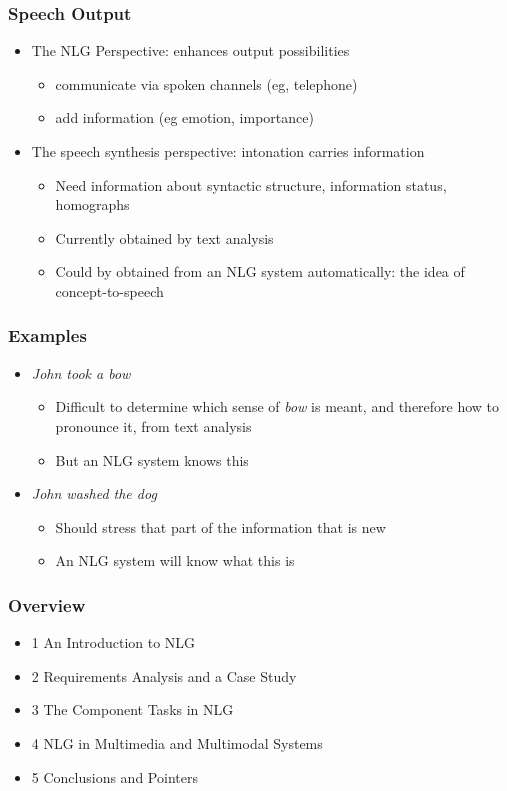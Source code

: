 \documentclass[compress,color=usenames]{beamer}
\begin{document}
\begin{frame}
\frametitle{
Speech Output}

\label{f93}
\begin{itemize}
\item {{The NLG Perspective: enhances output possibilities}}
\begin{itemize}
\item communicate via spoken channels (eg, telephone)
\item add information (eg emotion, importance)
\end{itemize}
\item {{The speech synthesis perspective: intonation carries information}}
\begin{itemize}
\item Need information about syntactic structure, information status, homographs
\item Currently obtained by text analysis
\item Could by obtained from an NLG system automatically:  the idea of concept-to-speech
\end{itemize}
\end{itemize}
 
\end{frame}

\begin{frame}
\frametitle{
Examples}

\label{f95}
\begin{itemize}
\item {{\textit{John took a bow}}}
\begin{itemize}
\item Difficult to determine which sense of \textit{bow} is meant, and therefore how to pronounce it, from text analysis
\item But an NLG system knows this
\end{itemize}
\item {{\textit{John washed the dog}}}
\begin{itemize}
\item Should stress that part of the information that is new
\item An NLG system will know what this is
\end{itemize}
\end{itemize}
 
\end{frame}

\begin{frame}
\frametitle{
Overview}

\label{f97}
\begin{itemize}
\item {{1                An Introduction to NLG}}
\item {{2                Requirements Analysis and a Case Study}}
\item {{3                The Component Tasks in NLG}}
\item {{4                NLG in Multimedia and Multimodal Systems}}
\item {{5                Conclusions and Pointers}}
\end{itemize}
 
\end{frame}
\end{document}

